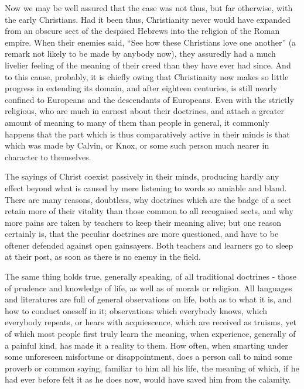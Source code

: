 Now we may be well assured that the case was not thus, but far otherwise, with the early Christians. Had it been thus, Christianity never would have expanded from an obscure sect of the despised Hebrews into the religion of the Roman empire. When their enemies said, “See how these Christians love one another” (a remark not likely to be made by anybody now), they assuredly had a much livelier feeling of the meaning of their creed than they have ever had since. And to this cause, probably, it is chiefly owing that Christianity now makes so little progress in extending its domain, and after eighteen centuries, is still nearly confined to Europeans and the descendants of Europeans. Even with the strictly religious, who are much in earnest about their doctrines, and attach a greater amount of meaning to many of them than people in general, it commonly happens that the part which is thus comparatively active in their minds is that which was made by Calvin, or Knox, or some such person much nearer in character to themselves.\par

The sayings of Christ coexist passively in their minds, producing hardly any effect beyond what is caused by mere listening to words so amiable and bland. There are many reasons, doubtless, why doctrines which are the badge of a sect retain more of their vitality than those common to all recognised sects, and why more pains are taken by teachers to keep their meaning alive; but one reason certainly is, that the peculiar doctrines are more questioned, and have to be oftener defended against open gainsayers. Both teachers and learners go to sleep at their post, as soon as there is no enemy in the field.\par

The same thing holds true, generally speaking, of all traditional doctrines - those of prudence and knowledge of life, as well as of morals or religion. All languages and literatures are full of general observations on life, both as to what it is, and how to conduct oneself in it; observations which everybody knows, which everybody repeats, or hears with acquiescence, which are received as truisms, yet of which most people first truly learn the meaning, when experience, generally of a painful kind, has made it a reality to them. How often, when smarting under some unforeseen misfortune or disappointment, does a person call to mind some proverb or common saying, familiar to him all his life, the meaning of which, if he had ever before felt it as he does now, would have saved him from the calamity.\par

